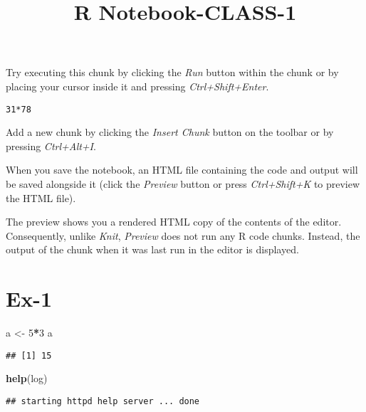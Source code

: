 \documentclass[
]{article}
\title{R Notebook-CLASS-1}
\author{}
\date{\vspace{-2.5em}}
\newenvironment{Shaded}{\begin{snugshade}}{\end{snugshade}}
\newcommand{\DecValTok}[1]{\textcolor[rgb]{0.00,0.00,0.81}{#1}}
\newcommand{\FunctionTok}[1]{\textcolor[rgb]{0.13,0.29,0.53}{\textbf{#1}}}
\newcommand{\NormalTok}[1]{#1}
\newcommand{\OtherTok}[1]{\textcolor[rgb]{0.56,0.35,0.01}{#1}}
\newcommand{\SpecialCharTok}[1]{\textcolor[rgb]{0.81,0.36,0.00}{\textbf{#1}}}
\begin{document}
\maketitle

Try executing this chunk by clicking the \emph{Run} button within the
chunk or by placing your cursor inside it and pressing
\emph{Ctrl+Shift+Enter}.

\begin{verbatim}
31*78
\end{verbatim}

Add a new chunk by clicking the \emph{Insert Chunk} button on the
toolbar or by pressing \emph{Ctrl+Alt+I}.

When you save the notebook, an HTML file containing the code and output
will be saved alongside it (click the \emph{Preview} button or press
\emph{Ctrl+Shift+K} to preview the HTML file).

The preview shows you a rendered HTML copy of the contents of the
editor. Consequently, unlike \emph{Knit}, \emph{Preview} does not run
any R code chunks. Instead, the output of the chunk when it was last run
in the editor is displayed.

\hypertarget{ex-1}{%
\section{Ex-1}\label{ex-1}}

\begin{Shaded}
\begin{Highlighting}[]
\NormalTok{a }\OtherTok{\textless{}{-}} \DecValTok{5}\SpecialCharTok{*}\DecValTok{3}
\NormalTok{a}
\end{Highlighting}
\end{Shaded}

\begin{verbatim}
## [1] 15
\end{verbatim}

\begin{Shaded}
\begin{Highlighting}[]
\FunctionTok{help}\NormalTok{(log)}
\end{Highlighting}
\end{Shaded}

\begin{verbatim}
## starting httpd help server ... done
\end{verbatim}
\end{document}
